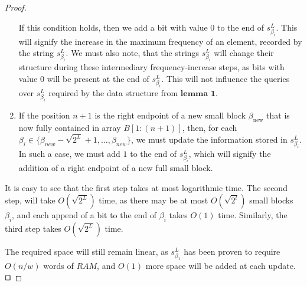 \documentclass[runningheads]{llncs}
\begin{document}
\begin{proof}
\begin{enumerate}
        If this condition holds, then we add a bit with value $0$ to the end of $s^L_{\beta_i}$. This will signify 
        the increase in the maximum frequency of an element, recorded by the string $s^{L}_{\beta_i}$. We must also note, that the strings $s^{L}_{\beta_i}$ will change 
        their structure during these intermediary frequency-increase steps, as bits with value $0$ will be present at the end of $s^{L}_{\beta_i}$. 
        This will not influence the queries over $s^{L}_{\beta_i}$ required by the data structure from $\textbf{lemma 1}$.

        \item If the position $n+1$ is the right endpoint of a new small block $\beta_{ \text{new} }$ that is now fully contained in array $B[1:(n+1) ]$, 
        then, for each $\beta_i\in \{ \beta_{new}-\sqrt{2^L}+1, \dots , \beta_{new} \}$,  we must update the information stored in $s^L_{\beta_i}$. 
        In such a case, we must add $1$ to the end of $s^L_{\beta_i}$, which will signify the addition of a right endpoint of a new full small block.  
        
    \end{enumerate}

    It is easy to see that the first step takes at most logarithmic time. The second step, will take $O(\sqrt{2^L})$ time, as there may be at most $O(\sqrt{2^l})$ small blocks $\beta_i$, 
    and each append of a bit to the end of $\beta_i$ takes $O(1)$ time. Similarly, the third step takes $O(\sqrt{2^L})$ time.

    The required space will still remain linear, as $s^L_{\beta_1}$ has been proven to require $O(n/w)$ words of $RAM$, and $O(1)$ more space will be added at each update. $\qed$

\end{proof}
\end{document}
